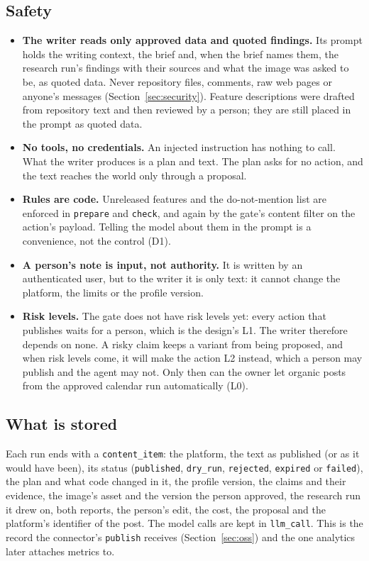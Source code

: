 \documentclass[11pt,a4paper]{article}
\begin{document}
\subsection{Safety}
\begin{itemize}
  \item \textbf{The writer reads only approved data and quoted findings.} Its prompt holds the writing context, the brief and, when the brief names them, the research run's findings with their sources and what the image was asked to be, as quoted data. Never repository files, comments, raw web pages or anyone's messages (Section~\ref{sec:security}). Feature descriptions were drafted from repository text and then reviewed by a person; they are still placed in the prompt as quoted data.
  \item \textbf{No tools, no credentials.} An injected instruction has nothing to call. What the writer produces is a plan and text. The plan asks for no action, and the text reaches the world only through a proposal.
  \item \textbf{Rules are code.} Unreleased features and the do-not-mention list are enforced in \texttt{prepare} and \texttt{check}, and again by the gate's content filter on the action's payload. Telling the model about them in the prompt is a convenience, not the control (D1).
  \item \textbf{A person's note is input, not authority.} It is written by an authenticated user, but to the writer it is only text: it cannot change the platform, the limits or the profile version.
  \item \textbf{Risk levels.} The gate does not have risk levels yet: every action that publishes waits for a person, which is the design's L1. The writer therefore depends on none. A risky claim keeps a variant from being proposed, and when risk levels come, it will make the action L2 instead, which a person may publish and the agent may not. Only then can the owner let organic posts from the approved calendar run automatically (L0).
\end{itemize}

\subsection{What is stored}
Each run ends with a \texttt{content\_item}: the platform, the text as published (or as it would have been), its status (\texttt{published}, \texttt{dry\_run}, \texttt{rejected}, \texttt{expired} or \texttt{failed}), the plan and what code changed in it, the profile version, the claims and their evidence, the image's asset and the version the person approved, the research run it drew on, both reports, the person's edit, the cost, the proposal and the platform's identifier of the post. The model calls are kept in \texttt{llm\_call}. This is the record the connector's \texttt{publish} receives (Section~\ref{sec:oss}) and the one analytics later attaches metrics to.
\end{document}
